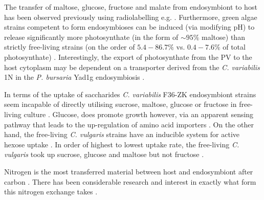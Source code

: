 
The transfer of maltose, glucose, fructose and malate from endosymbiont
to host has been observed previously using radiolabelling e.g.
\citep{Brown1974}.  Furthermore, green algae strains competent to
form endosymbioses can be induced (via modifying pH) to release significantly
more photosynthate (in the form of \(\sim 95\%\) maltose) than strictly free-living strains
(on the order of \(5.4-86.7\%\) vs. \(0.4-7.6\%\)
of total photosynthate) \citep{Muscatine1967a}.
Interestingly, the export of photosynthate from the PV to the host cytoplasm may be dependent on a transporter
derived from the \textit{C. variabilis} 1N in the \textit{P. bursaria} Yad1g endosymbiosis \citep{Kodama2008}.

In terms of the uptake of saccharides
\textit{C. variabilis} F36-ZK endosymbiont strains
seem incapable of directly utilising sucrose, maltose, glucose or fructose in free-living culture \citep{Kamako2005,Kato2009a}.
Glucose, does promote growth however, via an apparent sensing pathway that leads to the up-regulation
of amino acid importers \citep{Kato2009a}.
On the other hand, the free-living \textit{C. vulgaris} strains have an inducible 
system for active hexose uptake \citep{Tanner1974}.
In order of highest to lowest uptake rate, the free-living \textit{C. vulgaris} 
took up sucrose, glucose and maltose but not fructose \citep{Kato2009a}.


Nitrogen is the most transferred material between host and endosymbiont
after carbon \citep{Kato2009a}.  There has been considerable research and interest
in exactly what form this nitrogen exchange takes \citep{Kato2006,Kamako2005,McAuley1986}.

